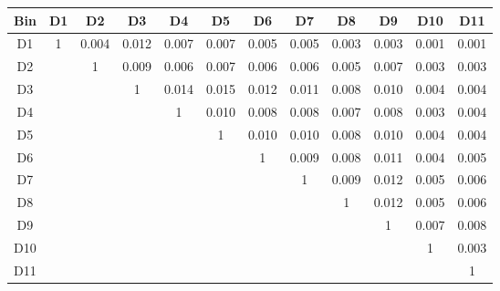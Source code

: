 \begin{tabular}{c@{~~~}c@{~~}c@{~~}c@{~~}c@{~~}c@{~~}c@{~~}c@{~~}c@{~~}c@{~~}c@{~~}c}
\hline
 \hline
Bin	& D1 & D2 & D3 & D4 & D5 & D6 & D7 & D8 & D9 & D10 & D11 \\
\hline
D1	&  1 &  0.004 &  0.012 &  0.007 &  0.007 &  0.005 &  0.005 &  0.003 &  0.003 &  0.001 &  0.001 \\
D2	&   &  1 &  0.009 &  0.006 &  0.007 &  0.006 &  0.006 &  0.005 &  0.007 &  0.003 &  0.003 \\
D3	&   &   &  1 &  0.014 &  0.015 &  0.012 &  0.011 &  0.008 &  0.010 &  0.004 &  0.004 \\
D4	&   &   &   &  1 &  0.010 &  0.008 &  0.008 &  0.007 &  0.008 &  0.003 &  0.004 \\
D5	&   &   &   &   &  1 &  0.010 &  0.010 &  0.008 &  0.010 &  0.004 &  0.004 \\
D6	&   &   &   &   &   &  1 &  0.009 &  0.008 &  0.011 &  0.004 &  0.005 \\
D7	&   &   &   &   &   &   &  1 &  0.009 &  0.012 &  0.005 &  0.006 \\
D8	&   &   &   &   &   &   &   &  1 &  0.012 &  0.005 &  0.006 \\
D9	&   &   &   &   &   &   &   &   &  1 &  0.007 &  0.008 \\
D10	&   &   &   &   &   &   &   &   &   &  1 &  0.003 \\
D11	&   &   &   &   &   &   &   &   &   &   &  1 \\
\hline
 \hline
\end{tabular}
